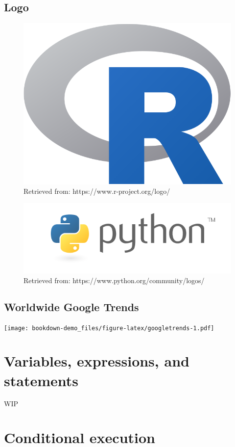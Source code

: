 \documentclass[]{book}
\begin{document}
\hypertarget{logo}{%
\section{Logo}\label{logo}}

\begin{figure}

{\centering \includegraphics[width=0.3\linewidth]{fig/C1_Rlogo} 

}

\caption{Retrieved from: https://www.r-project.org/logo/}\label{fig:unnamed-chunk-1}
\end{figure}

\begin{figure}

{\centering \includegraphics[width=0.6\linewidth]{fig/C1_Pythonlogo} 

}

\caption{Retrieved from: https://www.python.org/community/logos/}\label{fig:unnamed-chunk-2}
\end{figure}

\hypertarget{worldwide-google-trends}{%
\section{Worldwide Google Trends}\label{worldwide-google-trends}}

\texttt{[image: bookdown-demo\_files/figure-latex/googletrends-1.pdf]}

\hypertarget{variables-expressions-and-statements}{%
\chapter{Variables, expressions, and statements}\label{variables-expressions-and-statements}}

WIP

\hypertarget{conditional-execution}{%
\chapter{Conditional execution}\label{conditional-execution}}
\end{document}
